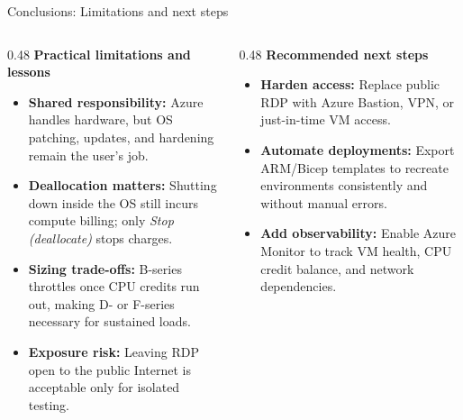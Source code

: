 \documentclass[aspectratio=169,xcolor=dvipsnames]{beamer}
\begin{document}
	\begin{frame}{Conclusions: Limitations and next steps}
		\begin{columns}[T]
			\begin{column}{0.48\textwidth}
				\textbf{\large Practical limitations and lessons}
				\begin{itemize}
					\setlength{\itemsep}{0.5em}
					\item \textbf{Shared responsibility:} Azure handles hardware, but OS patching, updates, and hardening remain the user's job.
					\item \textbf{Deallocation matters:} Shutting down inside the OS still incurs compute billing; only \textit{Stop (deallocate)} stops charges.
					\item \textbf{Sizing trade-offs:} B-series throttles once CPU credits run out, making D- or F-series necessary for sustained loads.
					\item \textbf{Exposure risk:} Leaving RDP open to the public Internet is acceptable only for isolated testing.
				\end{itemize}
			\end{column}
			
			\begin{column}{0.48\textwidth}
				\textbf{\large Recommended next steps}
				\begin{itemize}
					\setlength{\itemsep}{0.5em}
					\item \textbf{Harden access:} Replace public RDP with Azure Bastion, VPN, or just-in-time VM access.
					\item \textbf{Automate deployments:} Export ARM/Bicep templates to recreate environments consistently and without manual errors.
					\item \textbf{Add observability:} Enable Azure Monitor to track VM health, CPU credit balance, and network dependencies.
				\end{itemize}
			\end{column}
		\end{columns}
	\end{frame}
	
\end{document}
